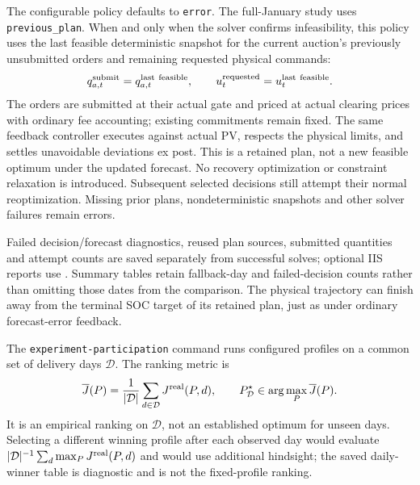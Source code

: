 \documentclass[11pt,a4paper]{article}
\begin{document}
The configurable policy  defaults to
\texttt{error}. The full-January study uses \texttt{previous\_plan}. When and only
when the solver confirms infeasibility, this policy uses the last feasible
deterministic snapshot for the current auction's previously unsubmitted orders
and remaining requested physical commands:
\begin{equation}
 q^{\rm submit}_{a,t}=q^{\rm last\ feasible}_{a,t},\qquad
 u^{\rm requested}_t=u^{\rm last\ feasible}_t.
\end{equation}
The orders are submitted at their actual gate and priced at actual clearing
prices with ordinary fee accounting; existing commitments remain fixed. The
same feedback controller executes against actual PV, respects the physical
limits, and settles unavoidable deviations ex post. This is a retained plan,
not a new feasible optimum under the updated forecast. No recovery optimization
or constraint relaxation is introduced. Subsequent selected decisions still
attempt their normal reoptimization. Missing prior plans, nondeterministic
snapshots and other solver failures remain errors.

Failed decision/forecast diagnostics, reused plan sources, submitted quantities
and attempt counts are saved separately from successful solves; optional IIS
reports use . Summary tables retain
fallback-day and failed-decision counts rather than omitting those dates from
the comparison. The physical trajectory can finish away from the terminal SOC
target of its retained plan, just as under ordinary forecast-error feedback.

The \texttt{experiment-participation} command runs configured profiles on a common
set of delivery days $\mathcal D$. The ranking metric is
\begin{equation}
 \overline J(P)=\frac{1}{|\mathcal D|}
       \sum_{d\in\mathcal D}J^{\rm real}(P,d),\qquad
 P^\star_{\mathcal D}\in\arg\max_P\overline J(P).
\end{equation}
It is an empirical ranking on $\mathcal D$, not an established optimum for unseen
days. Selecting a different winning profile after each observed day would evaluate
$|\mathcal D|^{-1}\sum_d\max_P J^{\rm real}(P,d)$ and would use additional hindsight;
the saved daily-winner table is diagnostic and is not the fixed-profile ranking.
\end{document}

